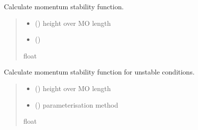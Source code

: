 \documentclass[letterpaper,10pt,english]{sphinxmanual}
\begin{document}
\begin{fulllineitems}

\pysigstartsignatures
{}
\pysigstopsignatures
\sphinxAtStartPar
Calculate momentum stability function.
\begin{quote}\begin{description}
\begin{itemize}
\item {} 
\sphinxAtStartPar
{} () \textendash{} height over MO length

\item {} 
\sphinxAtStartPar
{} () \textendash{} 

\end{itemize}

\sphinxAtStartPar
{}

\sphinxAtStartPar
float

\end{description}\end{quote}

\end{fulllineitems}



\begin{fulllineitems}

\pysigstartsignatures
{}
\pysigstopsignatures
\sphinxAtStartPar
Calculate momentum stability function for unstable conditions.
\begin{quote}\begin{description}
\begin{itemize}
\item {} 
\sphinxAtStartPar
{} () \textendash{} height over MO length

\item {} 
\sphinxAtStartPar
{} () \textendash{} parameterisation method

\end{itemize}

\sphinxAtStartPar
{}

\sphinxAtStartPar
float

\end{description}\end{quote}

\end{fulllineitems}
\end{document}
